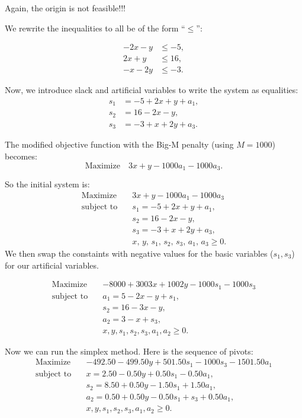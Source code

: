 Again, the origin is not feasible!!!

We rewrite the inequalities to all be of the form “$\le$”:

\[
\begin{aligned}
-2x - y &\leq -5, \\
2x + y &\leq 16, \\
-x - 2y &\leq -3.
\end{aligned}
\]

Now, we introduce slack and artificial variables to write the system as equalities:
\[
\begin{aligned}
s_1 &= -5 + 2x + y + a_1, \\
s_2 &= 16 - 2x - y, \\
s_3 &= -3 + x + 2y + a_3.
\end{aligned}
\]

The modified objective function with the Big-M penalty (using \( M = 1000 \)) becomes:
\[
\text{Maximize} \quad 3x + y - 1000a_1 - 1000a_3.
\]

So the initial system is:
\[
\begin{aligned}
\text{Maximize}\quad & 3x + y - 1000a_1 - 1000a_3 \\
\text{subject to}\quad 
& s_1 = -5 + 2x + y + a_1, \\
& s_2 = 16 - 2x - y, \\
& s_3 = -3 + x + 2y + a_3, \\
& x,\, y,\, s_1,\, s_2,\, s_3,\, a_1,\, a_3 \geq 0.
\end{aligned}
\]
We then swap the constaints with negative values for the basic variables ($s_1, s_3$) for our artificial variables.

\[
\begin{aligned}
\text{Maximize}\quad & -8000 + 3003x + 1002y - 1000s_1 - 1000s_3 \\
\text{subject to}\quad 
& a_1 = 5 - 2x - y + s_1,\\ 
& s_2 = 16 - 3x - y,\\ 
& a_2 = 3 - x + s_3,\\ 
& x, y, s_1, s_2, s_3, a_1, a_2 \ge 0.
\end{aligned}
\]

Now we can run the simplex method.  Here is the sequence of pivots:
\[
\begin{aligned}
\text{Maximize}\quad & -492.50 - 499.50y + 501.50s_1 - 1000s_3 - 1501.50a_1 \\
\text{subject to}\quad 
& x = 2.50 - 0.50y + 0.50s_1 - 0.50a_1,\\ 
& s_2 = 8.50 + 0.50y - 1.50s_1 + 1.50a_1,\\ 
& a_2 = 0.50 + 0.50y - 0.50s_1 + s_3 + 0.50a_1,\\ 
& x, y, s_1, s_2, s_3, a_1, a_2 \ge 0.
\end{aligned}
\]

